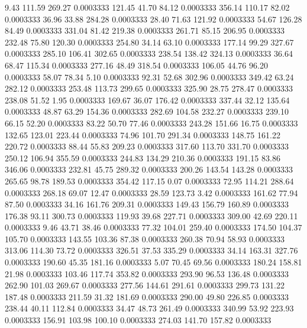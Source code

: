    9.43  111.59  269.27   0.0003333
 121.45   41.70   84.12   0.0003333
 356.14  110.17   82.02   0.0003333
  36.96   33.88  284.28   0.0003333
  28.40   71.63  121.92   0.0003333
  54.67  126.28   84.49   0.0003333
 331.04   81.42  219.38   0.0003333
 261.71   85.15  206.95   0.0003333
 232.48   75.80  120.30   0.0003333
 254.80   34.14   63.10   0.0003333
 177.14   99.29  327.67   0.0003333
 285.10  106.41  302.65   0.0003333
 238.54  138.42  324.13   0.0003333
  36.64   68.47  115.34   0.0003333
 277.16   48.49  318.54   0.0003333
 106.05   44.76   96.20   0.0003333
  58.07   78.34    5.10   0.0003333
  92.31   52.68  302.96   0.0003333
 349.42   63.24  282.12   0.0003333
 253.48  113.73  299.65   0.0003333
 325.90   28.75  278.47   0.0003333
 238.08   51.52    1.95   0.0003333
 169.67   36.07  176.42   0.0003333
 337.44   32.12  135.64   0.0003333
  48.87   63.29  154.36   0.0003333
 282.69  104.58  232.27   0.0003333
 239.10   66.15   52.20   0.0003333
  83.22   50.70   77.46   0.0003333
 243.28  151.66   16.75   0.0003333
 132.65  123.01  223.44   0.0003333
  74.96  101.70  291.34   0.0003333
 148.75  161.22  220.72   0.0003333
  88.44   55.83  209.23   0.0003333
 317.60  113.70  331.70   0.0003333
 250.12  106.94  355.59   0.0003333
 244.83  134.29  210.36   0.0003333
 191.15   83.86  346.06   0.0003333
 232.81   45.75  289.32   0.0003333
 200.26  143.54  143.28   0.0003333
 265.65   98.78  189.53   0.0003333
 354.42  117.15    0.07   0.0003333
  72.95  114.21  288.64   0.0003333
 268.18   69.07   12.47   0.0003333
  28.59  123.73    3.42   0.0003333
 161.62   77.94   87.50   0.0003333
  34.16  161.76  209.31   0.0003333
 149.43  156.79  160.89   0.0003333
 176.38   93.11  300.73   0.0003333
 119.93   39.68  227.71   0.0003333
 309.00   42.69  220.11   0.0003333
   9.46   43.71   38.46   0.0003333
  77.32  104.01  259.40   0.0003333
 174.50  104.37  105.70   0.0003333
 143.55  103.36   87.38   0.0003333
 260.38   70.94   58.93   0.0003333
 313.06  114.30   73.72   0.0003333
 326.51   37.53  335.29   0.0003333
  34.14  163.31  327.76   0.0003333
 190.60   45.35  181.16   0.0003333
   5.07   70.45   69.56   0.0003333
 180.24  158.81   21.98   0.0003333
 103.46  117.74  353.82   0.0003333
 293.90   96.53  136.48   0.0003333
 262.90  101.03  269.67   0.0003333
 277.56  144.61  291.61   0.0003333
 299.73  131.22  187.48   0.0003333
 211.59   31.32  181.69   0.0003333
 290.00   49.80  226.85   0.0003333
 238.44   40.11  112.84   0.0003333
  34.47   48.73  261.49   0.0003333
 340.99   53.92  223.93   0.0003333
 156.91  103.98  100.10   0.0003333
 274.03  141.70  157.82   0.0003333
